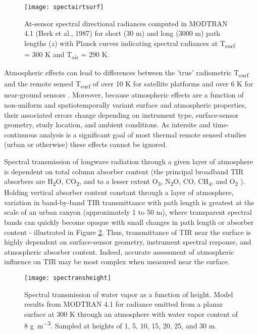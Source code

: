 \begin{bibunit}
\begin{figure}[H]
	\texttt{[image: spectairtsurf]}
	\caption{At-sensor spectral directional radiances computed in MODTRAN 4.1 (Berk et al., 1987) for short (30 \si{m}) and long (3000 \si{m}) path lengths ($z$) with Planck curves indicating spectral radiances at T\textsubscript{surf} = 300 \si{K} and T\textsubscript{air} = 290 \si{K}.}
	\label{spectairtsurf}
\end{figure}

Atmospheric effects can lead to differences between the 'true' radiometric T\textsubscript{surf} and the remote sensed T\textsubscript{surf} of over 10 \si{K} for satellite platforms \citep{Cooper1989} and over 6 \si{K} for near-ground sensors \citep{Meier2011}. Moreover, because atmospheric effects are a function of non-uniform and spatiotemporally variant surface and atmospheric properties, their associated errors change depending on instrument type, surface-sensor geometry, study location, and ambient conditions. As intersite and time-continuous analysis is a significant goal of most thermal remote sensed studies (urban or otherwise) these effects cannot be ignored.

Spectral transmission of longwave radiation through a given layer of atmosphere is dependent on total column absorber content (the principal broadband TIR absorbers are H\textsubscript{2}O, CO\textsubscript{2}, and to a lesser extent O\textsubscript{3}, N\textsubscript{2}O, CO, CH\textsubscript{4}, and O\textsubscript{2} \citep{Miskolczi1993}). Holding vertical absorber content constant through a layer of atmosphere, variation in band-by-band TIR transmittance with path length is greatest at the scale of an urban canyon (approximately 1 to 50 \si{\meter}), where transparent spectral bands can quickly become opaque with small changes in path length or absorber content - illustrated in Figure \ref{spectransheight}. Thus, transmittance of TIR near the surface is highly dependent on surface-sensor geometry, instrument spectral response, and atmospheric absorber content. Indeed, accurate assessment of atmospheric influence on TIR may be most complex when measured near the surface. 

\begin{figure}[H]
	\texttt{[image: spectransheight]}
	\caption{Spectral transmission of water vapor as a function of height. Model results from MODTRAN 4.1 for radiance emitted from a planar surface at 300 \si{\kelvin} through an atmosphere with water vapor content of 8 \si{\gram\per\meter\cubed}. Sampled at heights of 1, 5, 10, 15, 20, 25, and 30 \si{\meter}.}
	\label{spectransheight}
\end{figure}


\end{bibunit}
